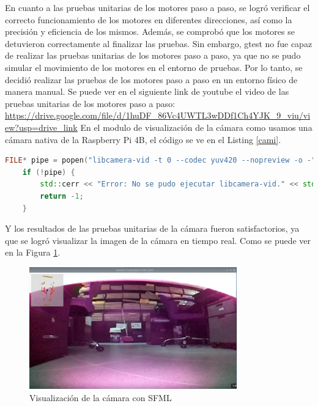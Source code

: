     En cuanto a las pruebas unitarias de los motores paso a paso, se logr\'o verificar el correcto funcionamiento de los motores en diferentes direcciones,
    as\'i como la precisi\'on y eficiencia de los mismos. Adem\'as, se comprob\'o que los motores se detuvieron correctamente al finalizar las pruebas.
    \vskip 0.5cm
    Sin embargo, gtest no fue capaz de realizar las pruebas unitarias de los motores paso a paso, ya que no se pudo simular el movimiento de los motores
    en el entorno de pruebas. Por lo tanto, se decidi\'o realizar las pruebas de los motores paso a paso en un entorno f\'isico de manera manual.
    Se puede ver en el siguiente link de youtube el video de las pruebas unitarias de los motores paso a paso: \url{https://drive.google.com/file/d/1huDF_86Vc4UWTL3wDDf1Ch4YJK_9_viu/view?usp=drive_link}
    \vskip 0.5cm
    En el modulo de visualizaci\'on de la c\'amara como usamos una c\'amara nativa de la Raspberry Pi 4B, el c\'odigo se ve en el Listing \ref{cami}. 
    \begin{lstlisting}[language={C++}, caption={main.cpp}, label={cami}]
        FILE* pipe = popen("libcamera-vid -t 0 --codec yuv420 --nopreview -o -", "r");
    if (!pipe) {
        std::cerr << "Error: No se pudo ejecutar libcamera-vid." << std::endl;
        return -1;
    }
    \end{lstlisting}
    \vskip 0.5cm
    Y los resultados de las pruebas unitarias de la c\'amara fueron satisfactorios, ya que se logr\'o visualizar la imagen de la c\'amara en tiempo real.
    Como se puede ver en la Figura \ref{fig:CameraTest1}.
    \vskip 0.5cm
    \begin{figure}[htbp]
        \centering
        \includegraphics[width=0.8\textwidth]{./images/Pruebas/robot/CamaraSFML01.png}
        \caption{Visualizaci\'on de la c\'amara con SFML}
        \label{fig:CameraTest1}
    \end{figure}
